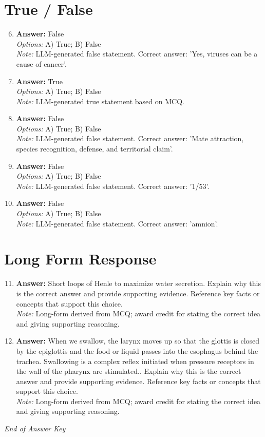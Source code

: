 \documentclass[12pt]{article}
\begin{document}
\section*{True / False}
\begin{enumerate}[label=\arabic*.]
\setcounter{enumi}{5}
\item \textbf{Answer:} False
\\ \textit{Options:} A) True; B) False
\\ \textit{Note:} LLM-generated false statement. Correct answer: 'Yes, viruses can be a cause of cancer'.
\item \textbf{Answer:} True
\\ \textit{Options:} A) True; B) False
\\ \textit{Note:} LLM-generated true statement based on MCQ.
\item \textbf{Answer:} False
\\ \textit{Options:} A) True; B) False
\\ \textit{Note:} LLM-generated false statement. Correct answer: 'Mate attraction, species recognition, defense, and territorial claim'.
\item \textbf{Answer:} False
\\ \textit{Options:} A) True; B) False
\\ \textit{Note:} LLM-generated false statement. Correct answer: '1/53'.
\item \textbf{Answer:} False
\\ \textit{Options:} A) True; B) False
\\ \textit{Note:} LLM-generated false statement. Correct answer: 'amnion'.
\end{enumerate}

\section*{Long Form Response}
\begin{enumerate}[label=\arabic*.]
\setcounter{enumi}{10}
\item \textbf{Answer:} Short loops of Henle to maximize water secretion. Explain why this is the correct answer and provide supporting evidence. Reference key facts or concepts that support this choice.
\\ \textit{Note:} Long-form derived from MCQ; award credit for stating the correct idea and giving supporting reasoning.
\item \textbf{Answer:} When we swallow, the larynx moves up so that the glottis is closed by the epiglottis and the food or liquid passes into the esophagus behind the trachea. Swallowing is a complex reflex initiated when pressure receptors in the wall of the pharynx are stimulated.. Explain why this is the correct answer and provide supporting evidence. Reference key facts or concepts that support this choice.
\\ \textit{Note:} Long-form derived from MCQ; award credit for stating the correct idea and giving supporting reasoning.
\end{enumerate}

\vfill
\noindent\textit{End of Answer Key}
\end{document}
